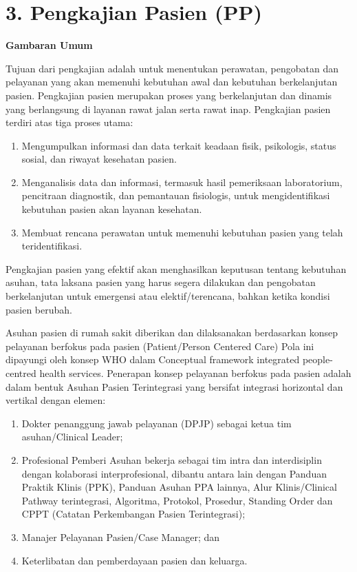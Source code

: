 \documentclass[
]{book}
\providecommand{\tightlist}{%
  \setlength{\itemsep}{0pt}\setlength{\parskip}{0pt}}
\begin{document}
\hypertarget{pengkajian-pasien-pp}{%
\section*{3. Pengkajian Pasien (PP)}\label{pengkajian-pasien-pp}}

\textbf{Gambaran Umum}

Tujuan dari pengkajian adalah untuk menentukan perawatan, pengobatan dan pelayanan yang akan memenuhi kebutuhan awal dan kebutuhan berkelanjutan pasien. Pengkajian pasien merupakan proses yang berkelanjutan dan dinamis yang berlangsung di layanan rawat jalan serta rawat inap. Pengkajian pasien terdiri atas tiga proses utama:

\begin{enumerate}
\def\labelenumi{\alph{enumi}.}
\tightlist
\item
  Mengumpulkan informasi dan data terkait keadaan fisik, psikologis, status sosial, dan riwayat kesehatan pasien.
\item
  Menganalisis data dan informasi, termasuk hasil pemeriksaan laboratorium, pencitraan diagnostik, dan pemantauan fisiologis, untuk mengidentifikasi kebutuhan pasien akan layanan kesehatan.
\item
  Membuat rencana perawatan untuk memenuhi kebutuhan pasien yang telah teridentifikasi.
\end{enumerate}

Pengkajian pasien yang efektif akan menghasilkan keputusan tentang kebutuhan asuhan, tata laksana pasien yang harus segera dilakukan dan pengobatan berkelanjutan untuk emergensi atau elektif/terencana, bahkan ketika kondisi pasien berubah.

Asuhan pasien di rumah sakit diberikan dan dilaksanakan berdasarkan konsep pelayanan berfokus pada pasien (Patient/Person Centered Care) Pola ini dipayungi oleh konsep WHO dalam Conceptual framework integrated people-centred health services. Penerapan konsep pelayanan berfokus pada pasien adalah dalam bentuk Asuhan Pasien Terintegrasi yang bersifat integrasi horizontal dan vertikal dengan elemen:

\begin{enumerate}
\def\labelenumi{\alph{enumi}.}
\tightlist
\item
  Dokter penanggung jawab pelayanan (DPJP) sebagai ketua tim asuhan/Clinical Leader;
\item
  Profesional Pemberi Asuhan bekerja sebagai tim intra dan interdisiplin dengan kolaborasi interprofesional, dibantu antara lain dengan Panduan Praktik Klinis (PPK), Panduan Asuhan PPA lainnya, Alur Klinis/Clinical Pathway terintegrasi, Algoritma, Protokol, Prosedur, Standing Order dan CPPT (Catatan Perkembangan Pasien Terintegrasi);
\item
  Manajer Pelayanan Pasien/Case Manager; dan
\item
  Keterlibatan dan pemberdayaan pasien dan keluarga.
\end{enumerate}
\end{document}
